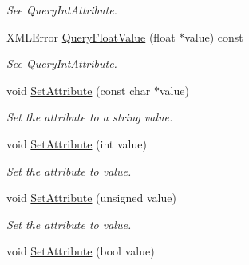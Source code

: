\begin{DoxyCompactItemize}
\begin{DoxyCompactList}\small\item\em See Query\+Int\+Attribute. \end{DoxyCompactList}\item 
\mbox{\label{classtinyxml2_1_1XMLAttribute_a049dea6449a6259b6cfed44a9427b607}} 
X\+M\+L\+Error \hyperlink{classtinyxml2_1_1XMLAttribute_a049dea6449a6259b6cfed44a9427b607}{Query\+Float\+Value} (float $\ast$value) const
\begin{DoxyCompactList}\small\item\em See Query\+Int\+Attribute. \end{DoxyCompactList}\item 
\mbox{\label{classtinyxml2_1_1XMLAttribute_a406d2c4a13c7af99a65edb59dd9f7581}} 
void \hyperlink{classtinyxml2_1_1XMLAttribute_a406d2c4a13c7af99a65edb59dd9f7581}{Set\+Attribute} (const char $\ast$value)
\begin{DoxyCompactList}\small\item\em Set the attribute to a string value. \end{DoxyCompactList}\item 
\mbox{\label{classtinyxml2_1_1XMLAttribute_ad86d7d7058d76761c3a80662566a57e5}} 
void \hyperlink{classtinyxml2_1_1XMLAttribute_ad86d7d7058d76761c3a80662566a57e5}{Set\+Attribute} (int value)
\begin{DoxyCompactList}\small\item\em Set the attribute to value. \end{DoxyCompactList}\item 
\mbox{\label{classtinyxml2_1_1XMLAttribute_ae70468c0f6df2748ba3529c716999fae}} 
void \hyperlink{classtinyxml2_1_1XMLAttribute_ae70468c0f6df2748ba3529c716999fae}{Set\+Attribute} (unsigned value)
\begin{DoxyCompactList}\small\item\em Set the attribute to value. \end{DoxyCompactList}\item 
\mbox{\label{classtinyxml2_1_1XMLAttribute_ab3516def4fe058fe328f2b89fc2d77da}} 
void \hyperlink{classtinyxml2_1_1XMLAttribute_ab3516def4fe058fe328f2b89fc2d77da}{Set\+Attribute} (bool value)

\end{DoxyCompactItemize}
